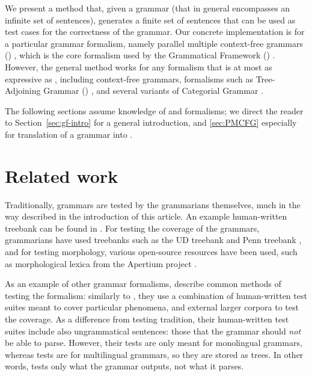 We present a method that, given a grammar (that in general encompasses
an infinite set of sentences), generates a finite set of sentences
that can be used as test cases for the correctness of the grammar. Our
concrete implementation is for a particular grammar formalism, namely
parallel multiple context-free grammars (\pmcfg) \cite{seki91pmcfg},
which is the core formalism used by the Grammatical Framework (\gf)
\cite{ranta2004gf}. However, the general method works for any
formalism that is at most as expressive as \pmcfg{}, including
context-free grammars, formalisms such as Tree-Adjoining Grammar
(\tagGrammar) \cite{joshi1975tag}, and several variants of Categorial
Grammar \cite{deGroote2004,steedman1988ccg}.

The following sections assume knowledge of \gf{} and \pmcfg{}
formalisms; we direct the reader to Section~\ref{sec:gf-intro} for a
general \gf{} introduction, and \ref{sec:PMCFG} especially for
translation of a \gf{} grammar into \pmcfg{}.


\section{Related work}

Traditionally, \gf{} grammars are tested by the grammarians
themselves, much in the way described in the introduction of this
article. An example human-written treebank can be found in
\citet[p.~136--142]{khegai2006phd}.  For testing the coverage of the
grammars, grammarians have used treebanks such as the UD treebank
\cite{nivre2016ud} and Penn treebank \cite{marcus1993penntreebank},
and for testing morphology, various open-source resources have been
used, such as morphological lexica from the Apertium project
\cite{forcada2011apertium}.

As an example of other grammar formalisms,
\citet[pp.~212--213]{butt1999lfg} describe common methods of testing
the \lfg{} formalism: similarly to \gf, they use a combination of
human-written test suites meant to cover particular phenomena, and
external larger corpora to test the coverage. As a difference from
\gf{} testing tradition, their human-written test suites include also
ungrammatical sentences: those that the grammar should \emph{not} be
able to parse. However, their tests are only meant for monolingual
grammars, whereas \gf{} tests are for multilingual grammars, so they
are stored as trees. In other words, \gf{} tests only what the grammar
outputs, not what it parses.

